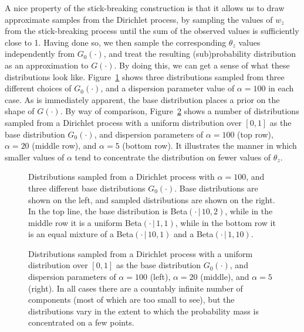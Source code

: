 \documentclass[authoryear]{elsarticle}
\newcommand{\condon}{\,|\,}
\newcommand{\efc}{\vspace*{15pt}}
\begin{document}
A nice property of the stick-breaking construction is that it allows us to draw approximate
samples from the Dirichlet process, by sampling the values of $w_z$ from the
stick-breaking process until the sum of the observed values is sufficiently close to 1.
Having done so, we then sample the corresponding $\theta_z$ values independently
from $G_0(\cdot)$, and treat the resulting (sub)probability distribution as an
approximation to $G(\cdot)$. By doing this, we can get a sense of what these
distributions look like. Figure~\ref{dpbase} shows three distributions sampled from
 three different choices of $G_0(\cdot)$, and a dispersion parameter value of
$\alpha=100$ in each case. As is immediately apparent, the base distribution
places a prior on the shape of $G(\cdot)$. By way of comparison,
Figure~\ref{dpuniforms}  shows a number of distributions sampled from a Dirichlet
process with a uniform distribution over $[0, 1]$ as the base distribution $G_0(\cdot)$,
and dispersion  parameters of $\alpha=100$ (top row), $\alpha=20$ (middle row),
and $\alpha=5$  (bottom row). It illustrates the manner in which smaller values of
$\alpha$ tend to concentrate the distribution on fewer values of $\theta_z$.

\begin{figure}[t]
        \begin{center}
        \caption{Distributions sampled from a Dirichlet process with $\alpha=100$,
        and three different base distributions $G_0(\cdot)$. Base distributions are
        shown on the left, and sampled distributions are shown on the right. In the
        top line, the base distribution is Beta$(\cdot \condon 10,2)$, while in the
        middle row it is a uniform Beta$(\cdot \condon 1,1)$, while in the bottom
        row it is an equal mixture of a Beta$(\cdot \condon 10,1)$ and a
        Beta$(\cdot \condon 1,10)$.\efc}
        \label{dpbase}
        \end{center}
\end{figure}

\begin{figure}[t]
        \begin{center}
        \caption{Distributions sampled from a Dirichlet process with a uniform distribution
        over $[0, 1]$ as the base distribution $G_0(\cdot)$, and dispersion parameters
        of $\alpha=100$ (left), $\alpha=20$ (middle), and $\alpha=5$ (right). In all cases
        there are a countably infinite number of components (most of which are too small to
        see), but the distributions vary in the extent to which the probability mass is
        concentrated on a few points.\efc}
        \label{dpuniforms}
        \end{center}
\end{figure}
\end{document}
